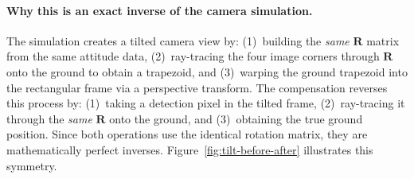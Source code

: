 \paragraph{Why this is an exact inverse of the camera simulation.}
The simulation creates a tilted camera view by: (1)~building the \emph{same} $\mathbf{R}$ matrix from the same attitude data, (2)~ray-tracing the four image corners through $\mathbf{R}$ onto the ground to obtain a trapezoid, and (3)~warping the ground trapezoid into the rectangular frame via a perspective transform.  The compensation reverses this process by: (1)~taking a detection pixel in the tilted frame, (2)~ray-tracing it through the \emph{same} $\mathbf{R}$ onto the ground, and (3)~obtaining the true ground position.  Since both operations use the identical rotation matrix, they are mathematically perfect inverses.  Figure~\ref{fig:tilt-before-after} illustrates this symmetry.

